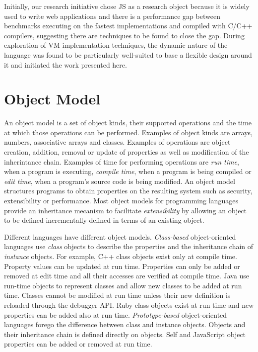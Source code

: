 Initially, our research initiative chose JS as a research object because it is
widely used to write web applications and there is a performance gap between
benchmarks executing on the fastest implementations and compiled with C/C++
compilers, suggesting there are techniques to be found to close the gap.
During exploration of VM implementation techniques, the dynamic nature of the
language was found to be particularly well-suited to base a flexible design
around it and initiated the work presented here.

\section{Object Model}

An object model is a set of object kinds, their supported operations and the
time at which those operations can be performed.  Examples of object kinds are
arrays, numbers, associative arrays and classes.  Examples of operations are
object creation, addition, removal or update of properties as well as
modification of the inherintance chain. Examples of time for performing
operations are \textit{run time}, when a program is executing, \textit{compile
time}, when a program is being compiled or \textit{edit time}, when a program's
source code is being modified. An object model structures programs to obtain
properties on the resulting system such as security, extensibility or
performance. Most object models for programming languages provide an
inheritance mecanism to facilitate \textit{extensibility} by allowing an object
to be defined incrementally defined in terms of an existing object.

Different languages have different object models. \textit{Class-based}
object-oriented languages use \textit{class} objects to describe the properties
and the inheritance chain of \textit{instance} objects. For example, C++ class
objects exist only at compile time. Property values can be updated at run time.
Properties can only be added or removed at edit time and all their accesses are
verified at compile time. Java use run-time objects to represent classes and
allow new classes to be added at run time.  Classes cannot be modified at run
time unless their new definition is reloaded through the debugger API. Ruby
class objects exist at run time and new properties can be added also at run
time. \textit{Prototype-based} object-oriented languages forego the difference
between class and instance objects. Objects and their inheritance chain is
defined directly on objects. Self and JavaScript object properties can be
added or removed at run time. 

